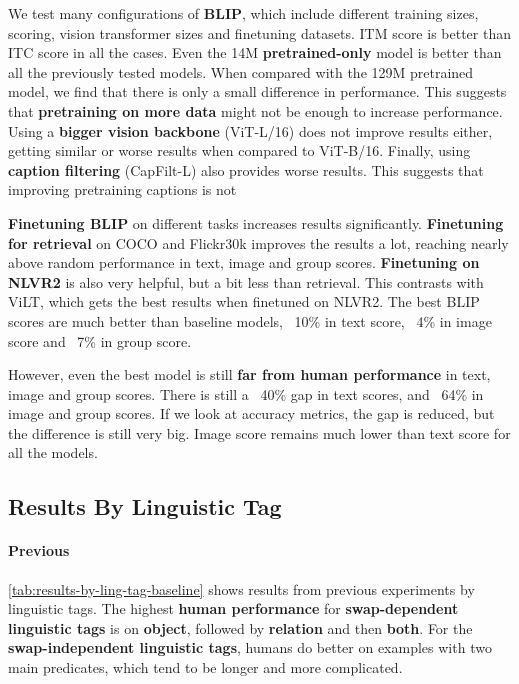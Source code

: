 We test many configurations of \textbf{BLIP}, which include different training sizes, scoring, vision transformer sizes and finetuning datasets. ITM score is better than ITC score in all the cases. Even the 14M \textbf{pretrained-only} model is better than all the previously tested models. When compared with the 129M pretrained model, we find that there is only a small difference in performance. This suggests that \textbf{pretraining on more data} might not be enough to increase performance. Using a \textbf{bigger vision backbone} (ViT-L/16) does not improve results either, getting similar or worse results when compared to ViT-B/16. Finally, using \textbf{caption filtering} (CapFilt-L) also provides worse results. This suggests that improving pretraining captions is not 

\textbf{Finetuning BLIP} on different tasks increases results significantly. \textbf{Finetuning for retrieval} on COCO and Flickr30k improves the results a lot, reaching nearly above random performance in text, image and group scores. \textbf{Finetuning on NLVR2} is also very helpful, but a bit less than retrieval. This contrasts with ViLT, which gets the best results when finetuned on NLVR2. The best BLIP scores are much better than baseline models, ~10\% in text score, ~4\% in image score and ~7\% in group score.

However, even the best model is still \textbf{far from human performance} in text, image and group scores. There is still a ~40\% gap in text scores, and ~64\% in image and group scores. If we look at accuracy metrics, the gap is reduced, but the difference is still very big. Image score remains much lower than text score for all the models.

\subsection{Results By Linguistic Tag} \label{winoground_results_linguistic}

\paragraph{Previous}

\cref{tab:results-by-ling-tag-baseline} shows results from previous experiments \cite{thrush2022winoground} by linguistic tags. The highest \textbf{human performance} for \textbf{swap-dependent linguistic tags} is on \textbf{object}, followed by \textbf{relation} and then \textbf{both}. For the \textbf{swap-independent linguistic tags}, humans do better on examples with two main predicates, which tend to be longer and more complicated.

